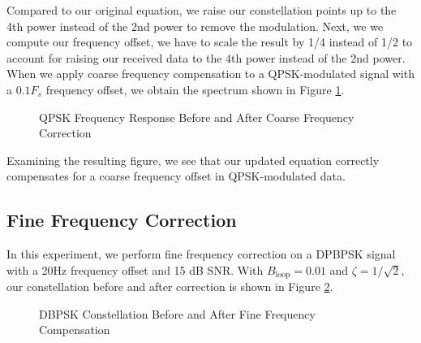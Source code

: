 \documentclass{article}
\begin{document}
\noindent Compared to our original equation, we raise our constellation points up to the 4th power instead of the 2nd power to remove the modulation. Next, we we compute our frequency offset, we have to scale the result by 1/4 instead of 1/2 to account for raising our received data to the 4th power instead of the 2nd power. When we apply coarse frequency compensation to a QPSK-modulated signal with a $0.1F_s$ frequency offset, we obtain the spectrum shown in Figure \ref{fig::psd_qpsk_with_cfc}.
 
\begin{figure}[H]
	\centerline{}
	\caption{QPSK Frequency Response Before and After Coarse Frequency Correction}
	\label{fig::psd_qpsk_with_cfc}
\end{figure}

\noindent Examining the resulting figure, we see that our updated equation correctly compensates for a coarse frequency offset in QPSK-modulated data.

\subsection{Fine Frequency Correction}

In this experiment, we perform fine frequency correction on a DPBPSK signal with a 20Hz frequency offset and 15 dB SNR. With $B_\text{loop} = 0.01$ and $\zeta = 1/\sqrt{2}$, our constellation before and after correction is shown in Figure \ref{fig::fine_freq_comp_bpsk_const}.

\begin{figure}[H]
	\centerline{}
	\caption{DBPSK Constellation Before and After Fine Frequency Compensation}
	\label{fig::fine_freq_comp_bpsk_const}
\end{figure}
\end{document}
